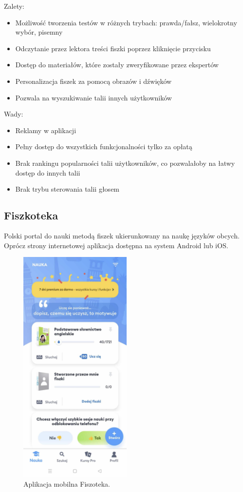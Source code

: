 Zalety:
\begin{itemize}[label=-]
    \item Możliwość tworzenia testów w różnych trybach: prawda/fałsz, wielokrotny wybór, pisemny
    \item Odczytanie przez lektora treści fiszki poprzez kliknięcie przycisku
    \item Dostęp do materiałów, które zostały zweryfikowane przez ekspertów
    \item Personalizacja fiszek za pomocą obrazów i dźwięków
    \item Pozwala na wyszukiwanie talii innych użytkowników
\end{itemize}

Wady:
\begin{itemize}[label=-]
    \item Reklamy w aplikacji
    \item Pełny dostęp do wszystkich funkcjonalności tylko za opłatą
    \item Brak rankingu popularności talii użytkowników, co pozwalałoby na łatwy dostęp do innych talii
    \item Brak trybu sterowania talii głosem
\end{itemize}

\subsection{Fiszkoteka}

Polski portal do nauki metodą fiszek ukierunkowany na naukę języków obcych. Oprócz strony internetowej aplikacja dostępna na system Android lub iOS.

\begin{figure}[H]
    \centering
    \includegraphics[width=0.5\textwidth]{chapters/chapter_3/fiszoteka.png}
    \caption{Aplikacja mobilna Fiszoteka.}
    \label{img:fiszoteka}
\end{figure}

